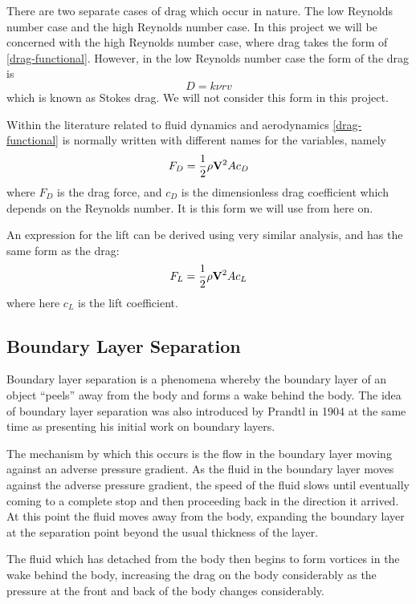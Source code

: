 There are two separate cases of drag which occur in nature. The low Reynolds number case and the
high Reynolds number case. In this project we will be concerned with the high Reynolds number case,
where drag takes the form of \eqref{drag-functional}. However, in the low Reynolds number case the form
of the drag is \citet{0143-0807-31-4-019}
\begin{equation}
D = k \nu r v
\end{equation}
which is known as Stokes drag. We will not consider this form in this project.

Within the literature related to fluid dynamics and aerodynamics \eqref{drag-functional} is normally written
with different names for the variables, namely 
\begin{equation} \label{drag}
F_{D} = \frac{1}{2} \rho \mathbf{V}^2 A c_{D}
\end{equation}
where $F_{D}$ is the drag force, and $c_{D}$ is the dimensionless drag coefficient which depends on 
the Reynolds number. It is this form
we will use from here on. 

An expression for the lift can be derived using very similar analysis, and has the same form as the
drag:
\begin{equation} \label{lift}
F_{L} = \frac{1}{2} \rho \mathbf{V}^2 A c_{L}
\end{equation}
where here $c_{L}$ is the lift coefficient.

\subsection{Boundary Layer Separation}

Boundary layer separation is a phenomena whereby the boundary layer of an object ``peels'' away from
the body and forms a wake behind the body. The idea of boundary layer separation was also introduced
by Prandtl in 1904 at the same time as presenting his initial work on boundary layers.

The mechanism by which this occurs is the flow in the 
boundary layer moving against an adverse pressure gradient. As the fluid in the boundary layer moves
against the adverse pressure gradient, the speed of the fluid slows until eventually coming to a
complete stop and then proceeding back in the direction it arrived. At this point the fluid moves away
from the body, expanding the boundary layer at the separation
point beyond the usual thickness of the layer.

The fluid which has detached from the body then begins to form vortices in the wake behind the body,
increasing the drag on the body considerably as the pressure at the front and back of the body changes
considerably.

